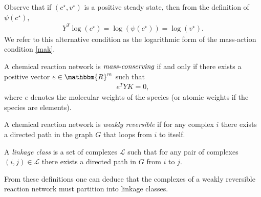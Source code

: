 \documentclass[smallextended]{svjour3}       %
\newcommand*{\0}{\mathbf{0}}
\newcommand*{\1}{\mathbf{1}}
\newcommand*{\R}{\mathbbm{R}}
\begin{document}
Observe that if $(c^\star,v^\star)$ is a positive steady state, then from the
definition of $\psi(c^\star)$,
\begin{align}
  Y^T\log(c^\star)= \log(\psi(c^\star))= \log(v^\star).
  \label{mak-alt}
	\tag{MA-log}
\end{align} 
We refer to this alternative condition as the logarithmic form of the
mass-action condition \eqref{mak}. 

\begin{defn}
	A chemical reaction network is $\emph{mass-conserving}$ if and only if there
	exists a positive vector $e\in\R^m$ such that 
	\begin{align}
	 e^TYK=0,
	  \label{consis}
	\end{align}
	where $e$ denotes the molecular weights of the species (or atomic weights if
	the species are elements).  
\end{defn}


\begin{defn} 
	A chemical reaction network is \emph{weakly reversible} if for any
    complex $i$ there exists a directed path in the graph $G$ that loops
    from $i$ to itself.
\end{defn} 

\begin{defn} 
    A \emph{linkage class} is a set of complexes $\mathcal{L}$ such that for any pair of complexes
    $(i,j) \in \mathcal{L}$ there exists a directed path in $G$ from $i$ to $j$. 
\end{defn}

From these definitions one can deduce that the complexes of a weakly reversible 
reaction network must partition into linkage classes.
\end{document}

